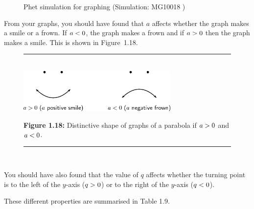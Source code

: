 \par \label{m39345*eip-481}
    \setcounter{subfigure}{0}
	\begin{figure}[H] %
    \textnormal{Phet simulation for graphing}\vspace{.1in} \nopagebreak
  \label{m39345*phet!!!underscore!!!sim}\label{m39345*phet-simulation}
             { (Simulation:  MG10018 )}
      \vspace{2pt}
    \vspace{.1in}
 \end{figure}       \par \label{m39345*id241684}From your graphs, you should have found that $a$ affects whether the graph makes a smile or a frown. If $a<{}0$, the graph makes a frown and if $a>{}0$ then the graph makes a smile. This is shown in Figure~1.18.\par 
    \setcounter{subfigure}{0}
	\begin{figure}[H] %
    \begin{center}
    \rule[.1in]{\figurerulewidth}{.005in} \\
        \label{m39345*uid115!!!underscore!!!media}\label{m39345*uid115!!!underscore!!!printimage}\includegraphics[width=300px]{col11306.imgs/m39345_MG10C11_014.png} %
      \vspace{2pt}
    \vspace{\rubberspace}\par \begin{cnxcaption}
	  \small \textbf{Figure 1.18: }Distinctive shape of graphs of a parabola if $a>{}0$ and $a<{}0$.
	\end{cnxcaption}
    \vspace{.1in}
    \rule[.1in]{\figurerulewidth}{.005in} \\
    \end{center}
 \end{figure}       
        \label{m39345*id241776}You should have also found that the value of $q$ affects whether the turning point is to the left of the $y$-axis ($q>{}0$) or to the right of the $y$-axis ($q<{}0$).\par 
        \label{m39345*id241837}These different properties are summarised in Table 1.9.\par 



